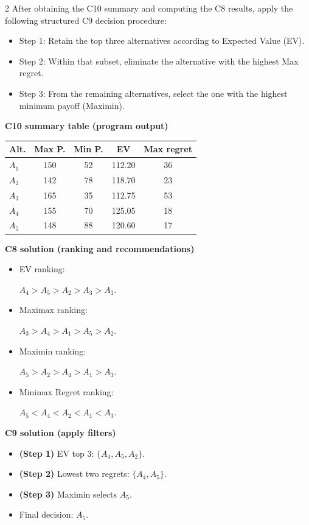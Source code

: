 \documentclass[12pt]{article}
\begin{document}
\begin{multicols}{2}
		After obtaining the C10 summary and computing the C8 results, apply the following structured C9 decision procedure:
		\begin{itemize}
			\item Step 1: Retain the top three alternatives according to Expected Value (EV).
			\item Step 2: Within that subset, eliminate the alternative with the highest Max regret.
			\item Step 3: From the remaining alternatives, select the one with the highest minimum payoff (Maximin).
		\end{itemize}
		
		\textbf{C10 summary table (program output)}\par
		\begin{center}
			\begin{tabular}{l c c c c}
				\hline
				Alt. & Max P. & Min P. & EV & Max regret \\
				\hline
				$A_1$ & 150 & 52 & 112.20 & 36 \\
				$A_2$ & 142 & 78 & 118.70 & 23 \\
				$A_3$ & 165 & 35 & 112.75 & 53 \\
				$A_4$ & 155 & 70 & 125.05 & 18 \\
				$A_5$ & 148 & 88 & 120.60 & 17 \\
				\hline
			\end{tabular}
		\end{center}
		
		\textbf{C8 solution (ranking and recommendations)}\par
		\begin{itemize}
			\item EV ranking: \par $A_4>A_5>A_2>A_3>A_1$.
			\item Maximax ranking:\par $A_3>A_4>A_1>A_5>A_2$.
			\item Maximin ranking: \par $A_5>A_2>A_4>A_1>A_3$.
			\item Minimax Regret ranking:\par $A_5<A_4<A_2<A_1<A_3$.
		\end{itemize}
		
		\textbf{C9 solution (apply filters)}\par
		\begin{itemize}
			\item \textbf{(Step 1)} EV top 3: $\{A_4,A_5,A_2\}$.
			\item \textbf{(Step 2)} Lowest two regrets: $\{A_4,A_5\}$.
			\item \textbf{(Step 3)} Maximin selects $A_5$.
			\item Final decision: $A_5$.
		\end{itemize}
		

\end{multicols}
\end{document}
